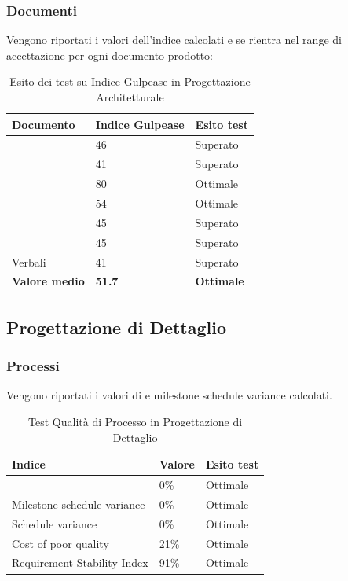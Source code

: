 \documentclass[12pt,a4paper]{article}
\begin{document}
\subsubsection{Documenti}
Vengono riportati i valori dell'indice  calcolati e se rientra nel range di accettazione per ogni documento prodotto:
\begin{table}[H]
	\begin{center}
		\begin{tabular}{p{} p{} p{}}
			\toprule
			\textbf{Documento}   & \textbf{Indice Gulpease}	& \textbf{Esito test} \\ \midrule
			\midrule
			\NdP & 46 &  Superato \\ \midrule
			\SdF & 41 &  Superato \\ \midrule
			\AdR & 80 &  Ottimale \\ \midrule
			\PdP & 54 &  Ottimale \\ \midrule
			\PdQ & 45 &  Superato \\ \midrule
			\DP & 45 &  Superato \\ \midrule
			Verbali & 41 &  Superato \\ \midrule\midrule
			\textbf{Valore medio} & \textbf{51.7}& \textbf{Ottimale}\\ 
			\bottomrule
		\end{tabular}
		\caption{Esito dei test su Indice Gulpease in Progettazione Architetturale}
	\end{center}
\end{table}
\subsection{Progettazione di Dettaglio}
\subsubsection{Processi}
Vengono riportati i valori di  e  milestone schedule variance calcolati. 

\begin{table}[H]
	\begin{center}
		\begin{tabular}{p{} p{} p{}}
			\toprule
			\textbf{Indice}   & \textbf{Valore}	& \textbf{Esito test} \\ \midrule
			\midrule
			\mgls{cost variance} & 0\% & Ottimale\\ \midrule
			Milestone schedule variance &  0\% & Ottimale\\ \midrule
			Schedule variance & 0\% & Ottimale \\ \midrule
			Cost of poor quality & 21\% & Ottimale \\ \midrule
			Requirement Stability Index & 91\% & Ottimale\\ \bottomrule
			\end{tabular}	
		\end{center}
		\caption{Test Qualità di Processo in Progettazione di Dettaglio}
	\end{table}
			
\end{document}
